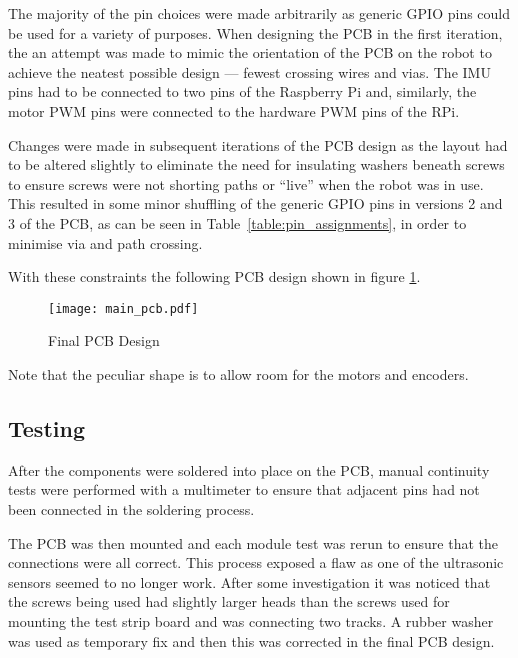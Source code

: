 The majority of the pin choices were made arbitrarily as generic GPIO 
pins could be used for a variety of purposes. When designing the PCB in 
the first iteration, the an attempt was made to mimic the orientation of 
the PCB on the robot to achieve the neatest possible design --- fewest 
crossing wires and vias. The IMU pins had to be connected to two \isc{} 
pins of the Raspberry Pi and, similarly, the motor PWM pins were 
connected to the hardware PWM pins of the RPi. 

Changes were made in subsequent iterations of the PCB design as the 
layout had to be altered slightly to eliminate the need for insulating 
washers beneath screws to ensure screws were not shorting paths or 
``live'' when the robot was in use. This resulted in some minor 
shuffling of the generic GPIO pins in versions 2 and 3 of the PCB, as 
can be seen in Table~\ref{table:pin_assignments}, in order to minimise 
via and path crossing. 

With these constraints the following PCB design shown in figure \ref{PCB_Design}.

\begin{figure}[!ht]
	\centering
	\texttt{[image: main\_pcb.pdf]}
	\caption{Final PCB Design}\label{PCB_Design}

\end{figure}
Note that the peculiar shape is to allow room for the motors and encoders.

\subsection{Testing}\label{elec/pcb/test}
After the components were soldered into place on the PCB, manual
continuity tests were performed with a multimeter to ensure that adjacent
pins had not been connected in the soldering process.

The PCB was then mounted and each module test was rerun to ensure that the
connections were all correct. This process exposed a flaw as one of the
ultrasonic sensors seemed to no longer work. After some investigation it
was noticed that the screws being used had slightly larger heads than the
screws used for mounting the test strip board and was connecting two
tracks. A rubber washer was used as temporary fix and then this was
corrected in the final PCB design.
